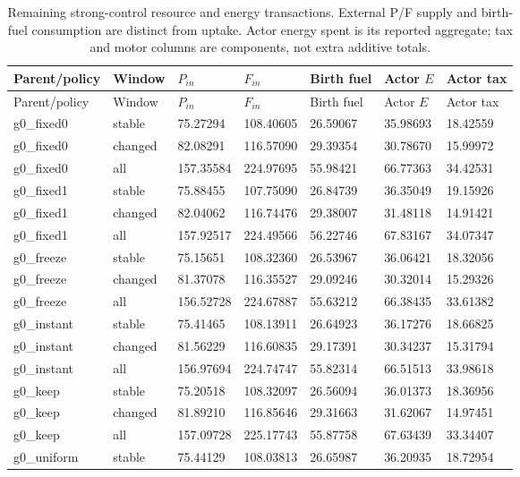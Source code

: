 \begin{longtable}{lllllll}
\caption{Remaining strong-control resource and energy transactions. External P/F supply and birth-fuel consumption are distinct from uptake. Actor energy spent is its reported aggregate; tax and motor columns are components, not extra additive totals.}\label{tab:maintenance-resource}\\
\toprule
Parent/policy & Window & $P_{in}$ & $F_{in}$ & Birth fuel & Actor $E$ & Actor tax \\
\midrule
\endfirsthead
\toprule
Parent/policy & Window & $P_{in}$ & $F_{in}$ & Birth fuel & Actor $E$ & Actor tax \\
\midrule
\endhead
g0\_fixed0 & stable & 75.27294 & 108.40605 & 26.59067 & 35.98693 & 18.42559 \\
g0\_fixed0 & changed & 82.08291 & 116.57090 & 29.39354 & 30.78670 & 15.99972 \\
g0\_fixed0 & all & 157.35584 & 224.97695 & 55.98421 & 66.77363 & 34.42531 \\
g0\_fixed1 & stable & 75.88455 & 107.75090 & 26.84739 & 36.35049 & 19.15926 \\
g0\_fixed1 & changed & 82.04062 & 116.74476 & 29.38007 & 31.48118 & 14.91421 \\
g0\_fixed1 & all & 157.92517 & 224.49566 & 56.22746 & 67.83167 & 34.07347 \\
g0\_freeze & stable & 75.15651 & 108.32360 & 26.53967 & 36.06421 & 18.32056 \\
g0\_freeze & changed & 81.37078 & 116.35527 & 29.09246 & 30.32014 & 15.29326 \\
g0\_freeze & all & 156.52728 & 224.67887 & 55.63212 & 66.38435 & 33.61382 \\
g0\_instant & stable & 75.41465 & 108.13911 & 26.64923 & 36.17276 & 18.66825 \\
g0\_instant & changed & 81.56229 & 116.60835 & 29.17391 & 30.34237 & 15.31794 \\
g0\_instant & all & 156.97694 & 224.74747 & 55.82314 & 66.51513 & 33.98618 \\
g0\_keep & stable & 75.20518 & 108.32097 & 26.56094 & 36.01373 & 18.36956 \\
g0\_keep & changed & 81.89210 & 116.85646 & 29.31663 & 31.62067 & 14.97451 \\
g0\_keep & all & 157.09728 & 225.17743 & 55.87758 & 67.63439 & 33.34407 \\
g0\_uniform & stable & 75.44129 & 108.03813 & 26.65987 & 36.20935 & 18.72954 \\

\end{longtable}
